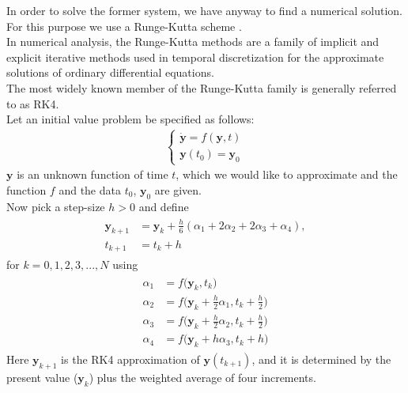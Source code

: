 In order to solve the former system, we have anyway to find a numerical solution. For this purpose we use a    
Runge-Kutta scheme  \cite{wiki_runge_kutta}.\\
In numerical analysis, the Runge-Kutta methods are a family of implicit and explicit iterative methods used in temporal discretization for the approximate solutions of ordinary differential equations.\\
The most widely known member of the Runge-Kutta family is generally referred to as RK4.\\
Let an initial value problem be specified as follows:
\begin{align}
\begin{cases}
\boldsymbol{\dot {y}} =f(\boldsymbol{y},t) \\[10pt]
\boldsymbol{y}(t_{0}) =\boldsymbol{y}_{0}
\end{cases}
\end{align}
$\boldsymbol{y}$ is an unknown function of time $t$, which we would like to approximate and the function $f$ and the data $t_{0}$, $\boldsymbol{y}_{0}$ are given.\\
Now pick a step-size $h > 0$ and define
\begin{align}
\begin{split}
\boldsymbol{y}_{k+1}&=\boldsymbol{y}_{k}+{\tfrac {h}{6}}\left(\alpha_{1}+2\alpha_{2}+2\alpha_{3}+\alpha_{4}\right),\\[10pt]
t_{k+1}&=t_{k}+h
\end{split}
\end{align}
for $k = 0, 1, 2, 3, ..., N$ using
\begin{align}
\begin{split}
\alpha_{1}&=f\Big(\boldsymbol{y}_{k},t_{k}\Big)\\[10pt]
\alpha_{2}&=f\Big(\boldsymbol{y}_{k}+{\frac {h}{2}}\alpha_{1},t_{k}+{\frac {h}{2}}\Big)\\[10pt]
\alpha_{3}&=f\Big(\boldsymbol{y}_{k}+{\frac {h}{2}}\alpha_{2},t_{k}+{\frac {h}{2}}\Big)\\[10pt]
\alpha_{4}&=f\Big(\boldsymbol{y}_{k}+h\alpha_{3},t_{k}+h\Big)
\end{split}
\end{align}
Here  $\boldsymbol{y}_{k+1}$ is the RK4 approximation of $\boldsymbol{y}(t_{k+1})$, and it is determined by the present value ($\boldsymbol{y}_{k}$) plus the weighted average of four increments.

